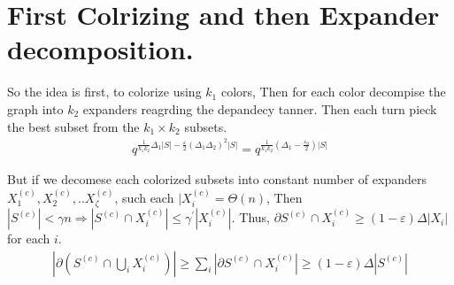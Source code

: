 \documentclass[manuscript,screen,review]{acmart}
\begin{document}
\section{First Colrizing and then Expander decomposition.}

So the idea is first, to colorize using $k_{1}$ colors, Then for each color decompise the graph into $k_{2}$ expanders reagrding the depandecy tanner. Then each turn pieck the best subset from the $k_{1} \times k_{2}$ subsets. 
\begin{equation*}
  \begin{split}
    q^{\frac{1}{k_{1}k_{2}}  \Delta_{1}|S| - \frac{\varepsilon}{2} (\Delta_{1}\Delta_{2})^{2} |S| } = q^{\frac{1}{k_{1}k_{2}} \left( \Delta_{1} - \frac{\varepsilon_{0}}{2} \right) |S| } 
  \end{split}
\end{equation*}

But if we decomese each colorized subsets into constant number of expanders $X_{1}^{(c)}, X_{2}^{(c)}, .. X_{\zeta}^{(c)}$, such each $|X_{i}^{(c)} = \Theta (n )$, Then $|S^{(c)}| < \gamma n \Rightarrow |S^{(c)} \cap X_{i}^{(c)}| \le \gamma^{\prime} |X_{i}^{(c)}|$. Thus, $\partial S^{(c)} \cap X^{(c)}_{i} \ge (1 - \varepsilon) \Delta |X_{i}| $ for each $i$. 
\begin{equation*}
  \begin{split}
    | \partial \left( S^{(c)} \cap \bigcup_{i} X_{i}^{(c)} \right) | \ge \sum_{i} | \partial  S^{(c)} \cap  X_{i}^{(c)} | \ge \left( 1 - \varepsilon \right)\Delta |S^{(c)}|
  \end{split}
\end{equation*}
\end{document}
